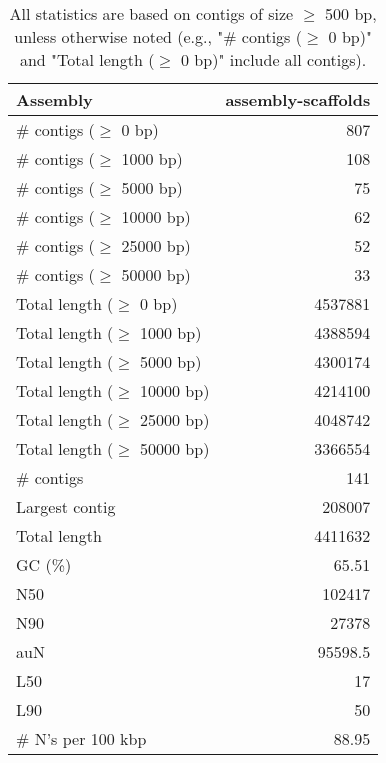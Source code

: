 \documentclass[12pt,a4paper]{article}
\begin{document}
\begin{table}[ht]
\begin{center}
\caption{All statistics are based on contigs of size $\geq$ 500 bp, unless otherwise noted (e.g., "\# contigs ($\geq$ 0 bp)" and "Total length ($\geq$ 0 bp)" include all contigs).}
\begin{tabular}{|l*{1}{|r}|}
\hline
Assembly & assembly-scaffolds \\ \hline
\# contigs ($\geq$ 0 bp) & 807 \\ \hline
\# contigs ($\geq$ 1000 bp) & 108 \\ \hline
\# contigs ($\geq$ 5000 bp) & 75 \\ \hline
\# contigs ($\geq$ 10000 bp) & 62 \\ \hline
\# contigs ($\geq$ 25000 bp) & 52 \\ \hline
\# contigs ($\geq$ 50000 bp) & 33 \\ \hline
Total length ($\geq$ 0 bp) & 4537881 \\ \hline
Total length ($\geq$ 1000 bp) & 4388594 \\ \hline
Total length ($\geq$ 5000 bp) & 4300174 \\ \hline
Total length ($\geq$ 10000 bp) & 4214100 \\ \hline
Total length ($\geq$ 25000 bp) & 4048742 \\ \hline
Total length ($\geq$ 50000 bp) & 3366554 \\ \hline
\# contigs & 141 \\ \hline
Largest contig & 208007 \\ \hline
Total length & 4411632 \\ \hline
GC (\%) & 65.51 \\ \hline
N50 & 102417 \\ \hline
N90 & 27378 \\ \hline
auN & 95598.5 \\ \hline
L50 & 17 \\ \hline
L90 & 50 \\ \hline
\# N's per 100 kbp & 88.95 \\ \hline
\end{tabular}
\end{center}
\end{table}
\end{document}
